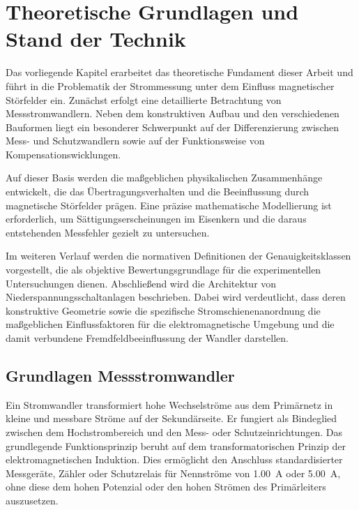

\section{Theoretische Grundlagen und Stand der Technik}
\label{chap:theorie}

Das vorliegende Kapitel erarbeitet das theoretische Fundament dieser Arbeit und führt in die Problematik der Strommessung unter dem Einfluss magnetischer Störfelder ein. Zunächst erfolgt eine detaillierte Betrachtung von Messstromwandlern. Neben dem konstruktiven Aufbau und den verschiedenen Bauformen liegt ein besonderer Schwerpunkt auf der Differenzierung zwischen Mess- und Schutzwandlern sowie auf der Funktionsweise von Kompensationswicklungen.

Auf dieser Basis werden die maßgeblichen physikalischen Zusammenhänge entwickelt, die das Übertragungsverhalten und die Beeinflussung durch magnetische Störfelder prägen. Eine präzise mathematische Modellierung ist erforderlich, um Sättigungserscheinungen im Eisenkern und die daraus entstehenden Messfehler gezielt zu untersuchen.

Im weiteren Verlauf werden die normativen Definitionen der Genauigkeitsklassen vorgestellt, die als objektive Bewertungsgrundlage für die experimentellen Untersuchungen dienen. Abschließend wird die Architektur von Niederspannungsschaltanlagen beschrieben. Dabei wird verdeutlicht, dass deren konstruktive Geometrie sowie die spezifische Stromschienenanordnung die maßgeblichen Einflussfaktoren für die elektromagnetische Umgebung und die damit verbundene Fremdfeldbeeinflussung der Wandler darstellen.

\subsection{Grundlagen Messstromwandler}
\label{sec:grundlagen_wandler}

Ein Stromwandler transformiert hohe Wechselströme aus dem Primärnetz in kleine und messbare Ströme auf der Sekundärseite. Er fungiert als Bindeglied zwischen dem Hochstrombereich und den Mess- oder Schutzeinrichtungen. Das grundlegende Funktionsprinzip beruht auf dem transformatorischen Prinzip der elektromagnetischen Induktion. Dies ermöglicht den Anschluss standardisierter Messgeräte, Zähler oder Schutzrelais für Nennströme von \SI{1,00}{\ampere} oder \SI{5,00}{\ampere}, ohne diese dem hohen Potenzial oder den hohen Strömen des Primärleiters auszusetzen.

